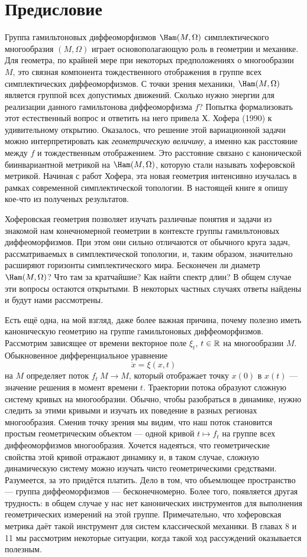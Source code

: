 \chapter*{Предисловие}

Группа гамильтоновых диффеоморфизмов $\Ham(M,\Omega)$ симплектического
многообразия $(M,\Omega)$ играет
основополагающую роль в геометрии и
механике.
Для геометра, по крайней мере при некоторых предположениях
о многообразии $M$, это связная компонента тождественного отображения
в группе всех симплектических диффеоморфизмов.
С точки зрения
механики, $\Ham(M,\Omega)$ является группой всех допустимых движений.
Сколько нужно энергии для реализации данного гамильтонова диффеоморфизма $f$?
Попытка формализовать этот естественный вопрос и ответить на него привела Х. Хофера \cite{H1} (1990) к удивительному открытию.
Оказалось, что решение этой вариационной задачи можно интерпретировать как {}\emph{геометрическую величину}, а именно как расстояние между $f$ и тождественным
отображением.
Это расстояние связано с канонической биинвариантной метрикой на $\Ham(M,\Omega)$, которую стали называть хоферовской метрикой.
Начиная с работ Хофера, эта новая геометрия интенсивно изучалась в рамках современной
симплектической топологии.
В настоящей книге я опишу кое-что из полученых результатов.

Хоферовская геометрия позволяет изучать различные понятия и задачи из знакомой нам конечномерной геометрии в контексте группы гамильтоновых диффеоморфизмов.
При этом они сильно отличаются от обычного круга задач, рассматриваемых в симплектической топологии, и, таким образом, значительно расширяют горизонты симплектического мира.
Бесконечен ли диаметр $\Ham(M,\Omega)$?
Что там за кратчайшие?
Как найти спектр длин?
В общем случае эти вопросы остаются открытыми.
В некоторых частных случаях ответы найдены и будут нами рассмотрены.

Есть ещё одна, на мой взгляд, даже более важная причина, почему полезно иметь каноническую геометрию на группе гамильтоновых диффеоморфизмов.
Рассмотрим зависящее от времени векторное поле $\xi_t$, $t\in \mathbb{R}$ на многообразии $M$.
Обыкновенное дифференциальное уравнение
\[\dot x=\xi(x,t)\]
на $M$ определяет поток $f_t\: M \to M$, который отображает точку $x(0)$ в $x(t)$ — значение решения в момент времени $t$.
Траектории потока образуют сложную систему кривых на многообразии.
Обычно, чтобы разобраться в динамике, нужно следить за этими кривыми и изучать их поведение в разных регионах многообразия.
Сменив точку зрения мы видим, что наш поток становится простым
геометрическим объектом — одной кривой $t \mapsto f_t$ на группе всех диффеоморфизмов многообразия.
Хочется надеяться, что геометрические свойства этой кривой отражают динамику и, в таком случае, сложную динамическую систему можно изучать чисто геометрическими средствами. 
Разумеется, за это придётся платить.
Дело в том, что объемлющее пространство — группа
диффеоморфизмов — бесконечномерно.
Более того, появляется другая трудность:
в общем случае у нас нет канонических инструментов для выполнения геометрических измерений на этой группе.
Примечательно, что хоферовская метрика даёт такой инструмент для систем классической механики.
В главах 8 и 11 мы рассмотрим некоторые ситуации,
когда такой ход рассуждений оказывается полезным.

